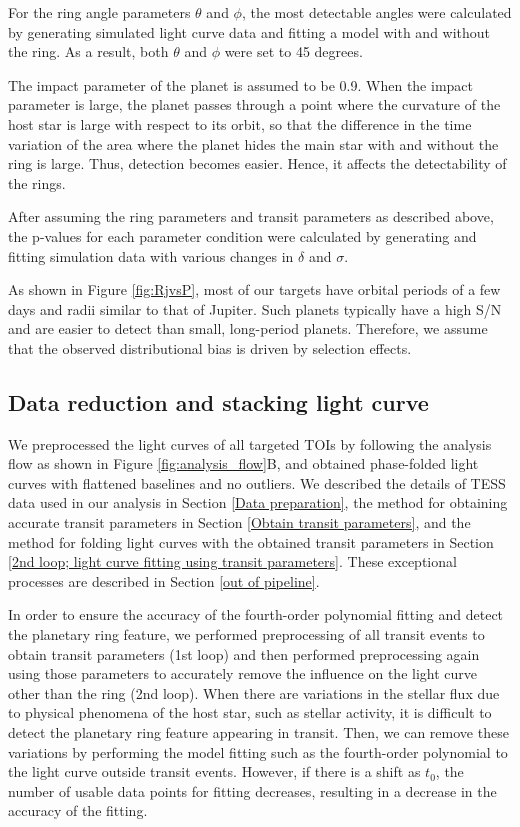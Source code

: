 \documentclass[fleqn,usenatbib, onecolumn,dvipdfmx]{mnras}
\begin{document}
For the ring angle parameters $\theta$ and $\phi$, the most detectable angles were calculated by generating simulated light curve data and fitting a model with and without the ring. As a result, both $\theta$ and $\phi$ were set to 45 degrees.

The impact parameter of the planet is assumed to be 0.9. When the impact parameter is large, the planet passes through a point where the curvature of the host star is large with respect to its orbit, so that the difference in the time variation of the area where the planet hides the main star with and without the ring is large. Thus, detection becomes easier. Hence, it affects the detectability of the rings.

After assuming the ring parameters and transit parameters as described above, the p-values for each parameter condition were calculated by generating and fitting simulation data with various changes in $\delta$ and $\sigma$.

As shown in Figure \ref{fig:RjvsP}, most of our targets have orbital periods of a few days and radii similar to that of Jupiter. Such planets typically have a high S/N and are easier to detect than small, long-period planets. Therefore, we assume that the observed distributional bias is driven by selection effects.

\subsection{Data reduction and stacking light curve}\label{Data reduction and stacking light curve}
We preprocessed the light curves of all targeted TOIs by following the analysis flow as shown in Figure \ref{fig:analysis_flow}B, and obtained phase-folded light curves with flattened baselines and no outliers. We described the details of TESS data used in our analysis in Section \ref{Data preparation}, the method for obtaining accurate transit parameters in Section \ref{Obtain transit parameters}, and the method for folding light curves with the obtained transit parameters in Section \ref{2nd loop; light curve fitting using transit parameters}. These exceptional processes are described in Section \ref{out of pipeline}.

In order to ensure the accuracy of the fourth-order polynomial fitting and detect the planetary ring feature, we performed preprocessing of all transit events to obtain transit parameters (1st loop) and then performed preprocessing again using those parameters to accurately remove the influence on the light curve other than the ring (2nd loop).
When there are variations in the stellar flux due to physical phenomena of the host star, such as stellar activity, it is difficult to detect the planetary ring feature appearing in transit. Then, we can remove these variations by performing the model fitting such as the fourth-order polynomial to the light curve outside transit events. However, if there is a shift as $t_0$, the number of usable data points for fitting decreases, resulting in a decrease in the accuracy of the fitting. 
\end{document}
